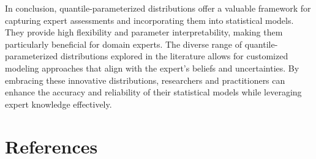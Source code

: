 \documentclass[
  fleqn,
  deca,
  blindrev
]{informs4}
\begin{document}
In conclusion, quantile-parameterized distributions offer a valuable
framework for capturing expert assessments and incorporating them into
statistical models. They provide high flexibility and parameter
interpretability, making them particularly beneficial for domain
experts. The diverse range of quantile-parameterized distributions
explored in the literature allows for customized modeling approaches
that align with the expert's beliefs and uncertainties. By embracing
these innovative distributions, researchers and practitioners can
enhance the accuracy and reliability of their statistical models while
leveraging expert knowledge effectively.

\section*{References}\label{references}

\renewcommand{\bibsection}{}

\end{document}
